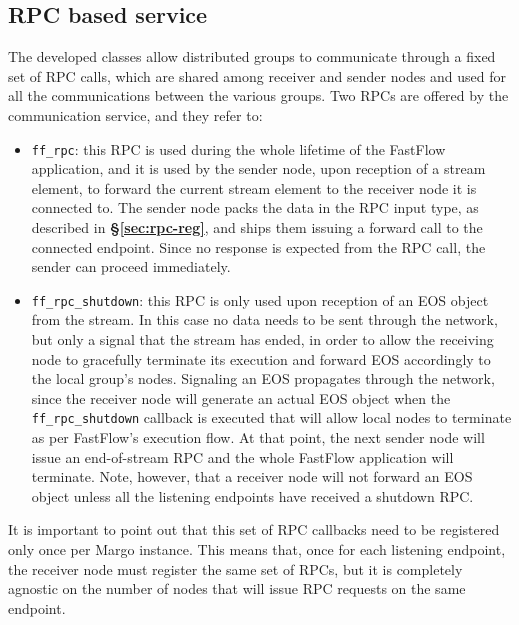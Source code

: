 \subsection{RPC based service}
The developed classes allow distributed groups to communicate through a fixed set of RPC calls, which are shared among receiver and sender nodes and used for all the communications between the various groups. Two RPCs are offered by the communication service, and they refer to:
\begin{itemize}
    \item \texttt{ff\_rpc}: this RPC is used during the whole lifetime of the FastFlow application, and it is used by the sender node, upon reception of a stream element, to forward the current stream element to the receiver node it is connected to. The sender node packs the data in the RPC input type, as described in \textbf{\S\ref{sec:rpc-reg}}, and ships them issuing a forward call to the connected endpoint. Since no response is expected from the RPC call, the sender can proceed immediately.
    \item \texttt{ff\_rpc\_shutdown}: this RPC is only used upon reception of an EOS object from the stream. In this case no data needs to be sent through the network, but only a signal that the stream has ended, in order to allow the receiving node to gracefully terminate its execution and forward EOS accordingly to the local group's nodes. Signaling an EOS propagates through the network, since the receiver node will generate an actual EOS object when the \texttt{ff\_rpc\_shutdown} callback is executed that will allow local nodes to terminate as per FastFlow's execution flow. At that point, the next sender node will issue an end-of-stream RPC and the whole FastFlow application will terminate. Note, however, that a receiver node will not forward an EOS object unless all the listening endpoints have received a shutdown RPC.
\end{itemize}

It is important to point out that this set of RPC callbacks need to be registered only once per Margo instance. This means that, once for each listening endpoint, the receiver node must register the same set of RPCs, but it is completely agnostic on the number of nodes that will issue RPC requests on the same endpoint. 


